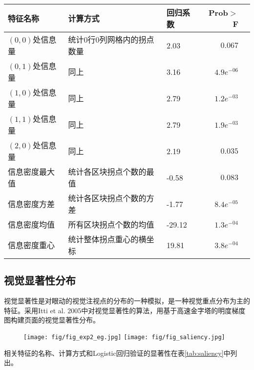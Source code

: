 \begin{table}[H]
  \centering
  \small
  \begin{tabular}{lllrr}
    \hline
     特征名称 & 计算方式 & 回归系数 & Prob$>$F \\
    \hline
    $(0, 0)$处信息量 & 统计0行0列网格内的拐点数量 & 2.03 & $0.067$\\
    $(0, 1)$处信息量 & 同上 & 3.16 & $4.9e^{-06}$\\
    $(1, 0)$处信息量 & 同上 & 2.79 & $1.2e^{-03}$\\
    $(1, 1)$处信息量 & 同上 & 2.79 & $1.9e^{-03}$\\
    $(2, 0)$处信息量 & 同上 & 2.19 & $0.035$\\
    信息密度最大值 & 统计各区块拐点个数的最值 & -0.58 & $0.083$\\
    信息密度方差 & 统计各区块拐点个数的方差 & -1.77 & $8.4e^{-05}$\\
    信息密度均值 & 所有区块拐点个数的均值 & -29.12 & $1.3e^{-04}$\\
    信息密度重心 & 统计整体拐点重心的横坐标 & 19.81 & $3.8e^{-04}$\\
    \hline
  \end{tabular}
\end{table}

\subsection{视觉显著性分布}
视觉显著性是对眼动的视觉注视点的分布的一种模拟，是一种视觉重点分布为主的特征。采用Itti et al. 2005中对视觉显著性的算法，用基于高速金字塔的明度梯度图构建页面的视觉显著性分布。

\begin{figure}[H]
  \texttt{[image: fig/fig\_exp2\_eg.jpg]}
  \texttt{[image: fig/fig\_saliency.jpg]}
\end{figure}

相关特征的名称、计算方式和Logistic回归验证的显著性在表\ref{tab:saliency}中列出。

